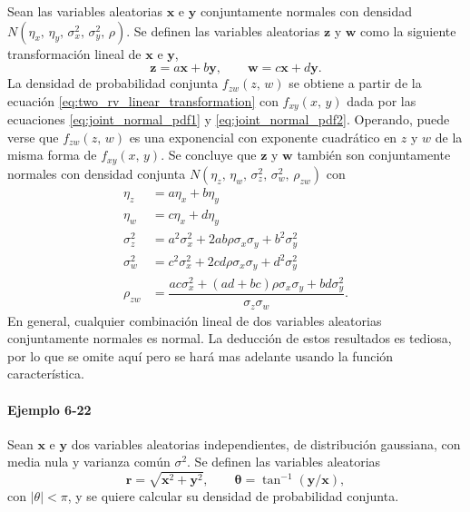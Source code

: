 \documentclass[a4paper]{report}
\newcommand{\x}{\mathbf{x}}
\newcommand{\y}{\mathbf{y}}
\newcommand{\w}{\mathbf{w}}
\newcommand{\z}{\mathbf{z}}
\begin{document}
Sean las variables aleatorias \(\x\) e \(\y\) conjuntamente normales con densidad \(N(\eta_x,\,\eta_y,\,\sigma_x^2,\,\sigma_y^2,\,\rho)\). Se definen las variables aleatorias \(\z\) y \(\w\) como la siguiente transformación lineal de \(\x\) e \(\y\),
\[
 \z=a\x+b\y,\qquad \w=c\x+d\y.
\]
La densidad de probabilidad conjunta \(f_{zw}(z,\,w)\) se obtiene a partir de la ecuación \ref{eq:two_rv_linear_transformation} con \(f_{xy}(x,\,y)\) dada por las ecuaciones \ref{eq:joint_normal_pdf1} y \ref{eq:joint_normal_pdf2}. Operando, puede verse que \(f_{zw}(z,\,w)\) es una exponencial con exponente cuadrático en \(z\) y \(w\) de la misma forma de \(f_{xy}(x,\,y)\). Se concluye que \(\z\) y \(\w\) también son conjuntamente normales con densidad conjunta \(N(\eta_z,\,\eta_w,\,\sigma_z^2,\,\sigma_w^2,\,\rho_{zw})\) con
\begin{equation}\label{eq:jointly_normal_linear_transformation}
 \begin{aligned}
 \eta_z&=a\eta_x+b\eta_y\\
 \eta_w&=c\eta_x+d\eta_y\\
 \sigma_z^2&=a^2\sigma_x^2+2ab\rho\sigma_x\sigma_y+b^2\sigma_y^2\\
 \sigma_w^2&=c^2\sigma_x^2+2cd\rho\sigma_x\sigma_y+d^2\sigma_y^2\\
 \rho_{zw}&=\dfrac{ac\sigma_x^2+(ad+bc)\rho\sigma_x\sigma_y+bd\sigma_y^2}{\sigma_z\sigma_w}.
\end{aligned}
\end{equation}
En general, cualquier combinación lineal de dos variables aleatorias conjuntamente normales es normal. La deducción de estos resultados es tediosa, por lo que se omite aquí pero se hará mas adelante usando la función característica.


\paragraph{Ejemplo 6-22} Sean \(\x\) e \(\y\) dos variables aleatorias independientes, de distribución gaussiana, con media nula y varianza común \(\sigma^2\). Se definen las variables aleatorias
\begin{equation}\label{eq:magnitude_and_phase_rv}
 \mathbf{r}=\sqrt{\x^2+\y^2}, \qquad\bm{\theta}=\tan^{-1}(\y/\x),
\end{equation}
con \(|\theta|<\pi\), y se quiere calcular su densidad de probabilidad conjunta.
\end{document}
